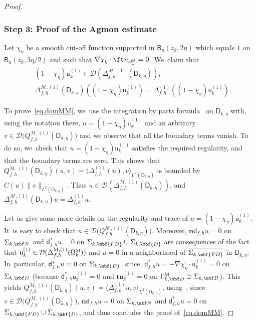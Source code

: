 \begin{proof}
\subsubsection*{Step 3: Proof of the Agmon estimate}
Let $\chi_\eta$ be a smooth cut-off function supported in $\mathsf
B_{a}(z_k,2\eta)$ which equals $1$ on $\mathsf B_{a}(z_k,3\eta/2)$ and such that $
\nabla \chi_\eta \cdot \ft n_{\mathsf \Omega_k^{\textsc{M}}} =0$. We~claim that
\begin{equation}\label{eq.domMM}
\begin{aligned}
&(1-\chi_\eta)\mathsf u^{(1)}_k\in \mathcal D(\Delta_{f,h}^{
\mathcal M,(1)} (\mathsf D_{k,\eta})),\\
& \Delta_{f,h}^{ \mathcal M,(1)} (\mathsf D_{k,\eta})((1-\chi_\eta)\mathsf u^{(1)}_k) = \Delta_{f,h}^{(1)}
((1-\chi_\eta)\mathsf u^{(1)}_k).
\end{aligned}
\end{equation}

To prove~\eqref{eq.domMM}, we~use the integration
by parts formula~\cite[Eq.\,(120)]{DLLN} on $\mathsf D_{k,\eta}$ with,
using the notation there,
$u=(1-\chi_\eta) \mathsf u^{(1)}_k$ and an arbitrary $v\in \mathcal D\bigl(Q_{f,h}^{ \mathcal M,(1)} (\mathsf D_{k,\eta})\bigr)$ and we
observe that all the boundary terms vanish. To do
so, we~check that $u=(1-\chi_\eta) \mathsf u^{(1)}_k$ satisfies the
required regularity, and that the boundary terms are zero. This
shows that $Q_{f,h}^{ \mathcal M,(1)} (\mathsf D_{k,\eta})(u,v) = \langle \Delta_{f,h}^{(1)}(u),v \rangle_{L^2(\mathsf D_{k,\eta})}$ is bounded by $ C(u) \|v\|_{L^2(\mathsf D_{k,\eta})} $. Thus $u \in
\mathcal D(\Delta_{f,h}^{ \mathcal M,(1)} (\mathsf D_{k,\eta}))$, and $\Delta_{f,h}^{ \mathcal M,(1)} (\mathsf D_{k,\eta}) u
= \Delta_{f,h}^{(1)}u $.

Let us give some more details on the regularity and trace of
$u=(1-\chi_\eta) \mathsf u^{(1)}_k$. It~is easy to check that $u \in \mathcal D\bigl(Q_{f,h}^{ \mathcal M,(1)} (\mathsf D_{k,\eta})\big)$. Moreover, $\mathbf
n\mathsf d_{f,h}u=0$ on $\Sigma_{k, \mbf N}$ and $\mathsf
d^*_{f,h}u=0$ on $\Sigma_{k, \mbf {FD}}\cup \Sigma_{k, \mbf {D}}$ are
consequences of the fact that $\mathsf u^{(1)}_k\in \mathcal
D(\Delta_{f,h}^{\text{M}, (1)}(\mathsf \Omega_k^{\textsc{M}}))$ and $u=0$ in a neighborhood of $\overline{\Sigma_{k, \mbf
{FD}}}$ in $\overline{\mathsf D_{k,\eta} }$. In~particular, $\mathsf d^*_{f,h}u=0 \text{ on } \Sigma_{k, \mbf {D}}$,
since, $\mathsf d_{f,h}^*u=-\nabla \chi_\eta\cdot \mathsf
u^{(1)}_k=0$ on $\Sigma_{k, \mbf D}$ (because $\mathsf d_{f,h}^*\mathsf u^{(1)}_k=0$ and $\mathbf t\mathsf
u^{(1)}_k=0$ on $\Gamma_{k,
\mbf D}^{\text{M}}\supset \Sigma_{k, \mbf D}$). This yields
$Q_{f,h}^{ \mathcal M,(1)} (\mathsf D_{k,\eta})(u,v) = \langle \Delta_{f,h}^{(1)}u,v \rangle_{L^2(\mathsf
D_{k,\eta})}$, using~\cite[Eq.\,(120)]{DLLN}, since $v\in \mathcal D\bigl(Q_{f,h}^{ \mathcal M,(1)} (\mathsf D_{k,\eta})\bigr)$, $\mathbf
n\mathsf d_{f,h}u=0$ on $\Sigma_{k, \mbf N}$ and $\mathsf
d^*_{f,h}u=0$ on $\Sigma_{k, \mbf {FD}}\cup \Sigma_{k, \mbf {D}}$, and
thus concludes the proof of~\ref{eq.domMM}.


\end{proof}
